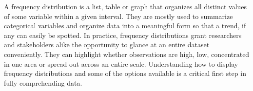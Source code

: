 A frequency distribution is a list, table or graph that organizes all distinct
values of some variable within a given interval. They are mostly used to summarize
categorical variables and organize data into a meaningful form so that a trend, 
if any can easily be spotted. In practice, frequency distributions grant researchers 
and stakeholders alike the opportunity to glance at an entire dataset conveniently. 
They can highlight whether observations are high, low, concentrated in one area or 
spread out across an entire scale. Understanding how to display frequency distributions
and some of the options available is a critical first step in fully comprehending 
data.  